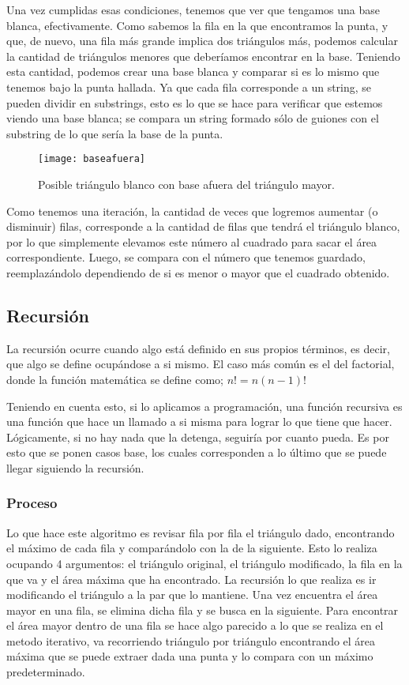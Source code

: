 \documentclass[letterpaper]{article}
\begin{document}
Una vez cumplidas esas condiciones, tenemos que ver que tengamos una base blanca,
efectivamente. Como sabemos la fila en la que encontramos la punta, y que, de nuevo,
una fila m\'as grande implica dos tri\'angulos m\'as, podemos calcular la cantidad
de tri\'angulos menores que deber\'iamos encontrar en la base. Teniendo esta
cantidad, podemos crear una base blanca y comparar si es lo mismo que tenemos bajo
la punta hallada. Ya que cada fila corresponde a un string, se pueden dividir en
substrings, esto es lo que se hace para verificar que estemos viendo una base
blanca; se compara un string formado s\'olo de guiones con el substring de lo que
ser\'ia la base de la punta.
  \begin{figure}[t!]
    \centering
    \texttt{[image: baseafuera]}
    \caption{Posible tri\'angulo blanco con base afuera del tri\'angulo mayor.}
    \label{fig:baseafuera}
  \end{figure}
  \par Como tenemos una iteraci\'on, la cantidad de veces que logremos aumentar
  (o disminuir) filas, corresponde a la cantidad de filas que tendr\'a el
  tri\'angulo blanco, por lo que simplemente elevamos este n\'umero al cuadrado
  para sacar el \'area correspondiente. Luego, se compara con el n\'umero que
  tenemos guardado, reemplaz\'andolo dependiendo de si es menor o mayor que el
  cuadrado obtenido.
  \newpage
  \subsection{Recursi\'on}
  La recursi\'on ocurre cuando algo est\'a definido en sus propios t\'erminos,
  es decir, que algo se define ocup\'andose a si mismo. El caso m\'as com\'un es
  el del factorial, donde la funci\'on matem\'atica se define como;
  $n! = n(n-1)!$


  Teniendo en cuenta esto, si lo aplicamos a programaci\'on, una funci\'on recursiva
  es una funci\'on que hace un llamado a si misma para lograr lo que tiene que hacer.
  L\'ogicamente, si no hay nada que la detenga, seguir\'ia por cuanto pueda. Es por
  esto que se ponen casos base, los cuales corresponden a lo \'ultimo que se puede
  llegar siguiendo la recursi\'on.
  \subsubsection{Proceso}

  Lo que hace este algoritmo es revisar fila por fila el tri\'angulo dado,
  encontrando el m\'aximo de cada fila y compar\'andolo con la de la siguiente.
  Esto lo realiza ocupando 4 argumentos: el tri\'angulo original, el tri\'angulo modificado,
  la fila en la que va y el \'area m\'axima que ha encontrado. La recursi\'on lo que realiza es ir modificando
  el tri\'angulo a la par que lo mantiene. Una vez encuentra el \'area mayor en una fila, se elimina dicha fila y
  se busca en la siguiente. Para encontrar el \'area mayor dentro de una fila se hace algo
  parecido a lo que se realiza en el metodo iterativo, va recorriendo tri\'angulo por tri\'angulo
  encontrando el \'area m\'axima que se puede extraer dada una punta y lo compara con un m\'aximo predeterminado.
\end{document}
